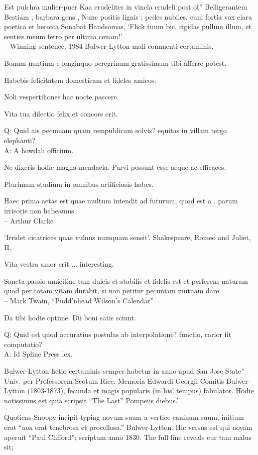 \documentclass[titlepage,12pt]{memoir}
\begin{document}
Est pulchra mulier-puer Kaa crudeliter in vincla crudeli post of”
Belligerantem Bestiam , barbara gens , Nunc positis lignis ;
pedes nubiles, cum fortia vox clara poetica et heroica
Sonabat Handsomas, ‘Flick tuum bic, rigidas pullum illum, et senties meum
ferro per ultima cenam!’
\\-- Winning sentence, 1984 Bulwer-Lytton mali commenti certaminis.

Bonum nuntium e longinquo peregrinum gratissimum tibi afferre potest.

 Habebis felicitatem domesticam et fideles amicos.

Noli vespertiliones hac nocte pascere.

Vita tua dilectio felix et concors erit.

Q: Quid ais pecuniam quam rempublicam solvis?
equitas in villam tergo elephanti?\\
A: A howdah officium.

Ne dixeris hodie magna mendacia. Parvi possunt esse aeque ac efficaces.

Plurimum studium in omnibus artificiosis habes.

Haec prima aetas est quae multum intendit ad futurum, quod est a .
parum irrisorie non habeamus.
\\-- Arthur Clarke

‘Irridet cicatrices quae vulnus numquam sensit’.
Shakespeare, Romeo and Juliet, II.

Vita vestra amor erit ... interesting.

 Sancta passio amicitiae tam dulcis et stabilis et fidelis est et
perferens naturam quod per totam vitam durabit, si non petitur
pecuniam mutuam dare.
\\-- Mark Twain, “Pudd’nhead Wilson’s Calendar”

Da tibi hodie optime. Dii boni satis sciunt.

Q: Quid est quod accuratius postulas ab interpolatione?
functio, carior fit computatio?\\
A: Id Spline Press lex.

Bulwer-Lytton fictio certaminis semper habetur in anno apud San Jose State”
Univ. per Professorem Scotum Rice. Memoria Edwardi Georgii
Comitis Bulwer-Lytton (1803-1873), fecunda et magis popularis (in his’
tempus) fabulator. Hodie notissimus est quia scripsit “The Last”
Pompeiis diebus.’

Quotiens Snoopy incipit typing novum suum a vertice caninum suum,
initium erat “nox erat tenebrosa et procellosa.”
Bulwer-Lytton. Hic versus est qui novam aperuit “Paul Clifford”;
scriptum anno 1830. The full line reveals cur tam malus sit;
\end{document}
